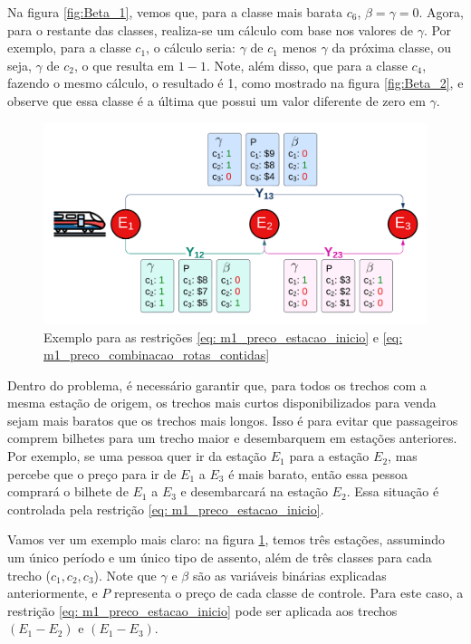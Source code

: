 Na figura \ref{fig:Beta_1}, vemos que, para a classe mais barata $c_6$, $\beta=\gamma=0$. Agora, para o restante das classes, realiza-se um cálculo com base nos valores de $\gamma$. Por exemplo, para a classe $c_1$, o cálculo seria: $\gamma$ de $c_1$ menos $\gamma$ da próxima classe, ou seja, $\gamma$ de $c_2$, o que resulta em $1-1$. Note, além disso, que para a classe $c_4$, fazendo o mesmo cálculo, o resultado é 1, como mostrado na figura \ref{fig:Beta_2}, e observe que essa classe é a última que possui um valor diferente de zero em $\gamma$.


\begin{figure}[!ht]
	\begin{center}
		\includegraphics[scale=0.2]{img/fulfill.png}
		\caption{Exemplo para as restrições \ref{eq: m1_preco_estacao_inicio} e \ref{eq: m1_preco_combinacao_rotas_contidas}}
		\label{fig: fulfill}
	\end{center}
\end{figure}

Dentro do problema, é necessário garantir que, para todos os trechos com a mesma estação de origem, os trechos mais curtos disponibilizados para venda sejam mais baratos que os trechos mais longos. Isso é para evitar que passageiros comprem bilhetes para um trecho maior e desembarquem em estações anteriores. Por exemplo, se uma pessoa quer ir da estação $E_1$ para a estação $E_2$, mas percebe que o preço para ir de $E_1$ a $E_3$ é mais barato, então essa pessoa comprará o bilhete de $E_1$ a $E_3$ e desembarcará na estação $E_2$. Essa situação é controlada pela restrição \ref{eq: m1_preco_estacao_inicio}. 

Vamos ver um exemplo mais claro: na figura \ref{fig: fulfill}, temos três estações, assumindo um único período e um único tipo de assento, além de três classes para cada trecho ($c_1, c_2, c_3$). Note que $\gamma$ e $\beta$ são as variáveis binárias explicadas anteriormente, e $P$ representa o preço de cada classe de controle. Para este caso, a restrição \ref{eq: m1_preco_estacao_inicio} pode ser aplicada aos trechos $(E_1-E_2)$ e $(E_1-E_3)$.

